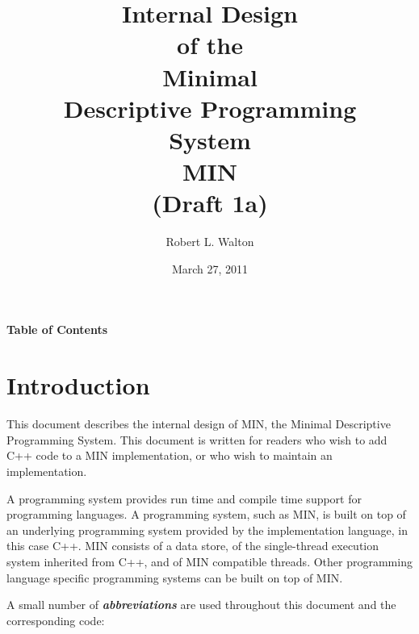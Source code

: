 \documentclass[12pt]{article}
\makeatletter
\renewcommand\tableofcontents{%
    \begin{list}{}%
	     {\setlength{\itemsep}{0in}%
	      \setlength{\topsep}{0in}%
	      \setlength{\parsep}{1ex}%
	      \setlength{\labelwidth}{0in}%
	      \setlength{\baselineskip}{1.5ex}%
	      \setlength{\leftmargin}{0.8in}%
	      \setlength{\rightmargin}{0.8in}}%
    \item\@starttoc{toc}%
    \end{list}}
\newcommand{\skey}[2]{{\bf \em #1#2}\index{#1}}
\makeatother
\begin{document}
        
\title{Internal Design\\[2ex]of the\\[2ex]
       Minimal\\Descriptive Programming\\System\\[2ex]MIN\\[2ex]
       (Draft 1a)}

\author{Robert L. Walton}

\date{March 27, 2011}
 
\maketitle

\newpage
\begin{center}
\large \bf Table of Contents
\end{center}

\bigskip

\tableofcontents 

\newpage

\section{Introduction}

This document describes the internal design of MIN,
the Minimal Descriptive Programming System.
This document is written for readers who wish to add C++ code
to a MIN implementation, or who wish to maintain an implementation.

A programming system provides run time and compile time support
for programming languages.
A programming system, such as MIN, is
built on top of an underlying programming system provided by the
implementation language, in this case C++.
MIN consists of a data store, of the single-thread execution system
inherited from C++, and of MIN compatible threads.
Other programming language specific
programming systems can be built on top of MIN.

A small number of \skey{abbreviation}s are used throughout this document
and the corresponding code:
\end{document}

